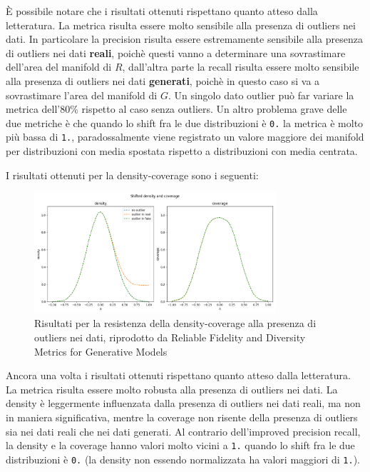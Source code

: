 È possibile notare che i risultati ottenuti rispettano quanto atteso dalla letteratura. La metrica risulta essere molto sensibile alla presenza di outliers nei dati.
In particolare la precision risulta essere estremamente sensibile alla presenza di outliers nei dati \textbf{reali}, poichè questi vanno a determinare una sovrastimare dell'area del manifold di \(R\), dall'altra parte 
la recall risulta essere molto sensibile alla presenza di outliers nei dati \textbf{generati}, poichè in questo caso si va a sovrastimare l'area del manifold di \(G\).
Un singolo dato outlier può far variare la metrica dell'80\% rispetto al caso senza outliers.
Un altro problema grave delle due metriche è che quando lo shift fra le due distribuzioni è \texttt{0.} la metrica è molto più bassa di \texttt{1.}, paradossalmente viene registrato un valore maggiore dei manifold per distribuzioni con media spostata rispetto a distribuzioni con media centrata.

I risultati ottenuti per la density-coverage sono i seguenti:

\begin{figure}[!ht]
    \centering
    \includegraphics[width=0.8\textwidth]{../images/toyexperiments/outliers/shift_density_coverage.png} 
    \caption{Risultati per la resistenza della density-coverage alla presenza di outliers nei dati, riprodotto da Reliable Fidelity and Diversity Metrics for Generative Models \cite{3ReliableFidelityDiversityMetrics}}
\end{figure}

Ancora una volta i risultati ottenuti rispettano quanto atteso dalla letteratura. La metrica risulta essere molto robusta alla presenza di outliers nei dati.
La density è leggermente influenzata dalla presenza di outliers nei dati reali, ma non in maniera significativa, mentre la coverage non risente della presenza di outliers sia nei dati reali che nei dati generati.
Al contrario dell'improved precision recall, la density e la coverage hanno valori molto vicini a \texttt{1.} quando lo shift fra le due distribuzioni è \texttt{0.} (la density non essendo normalizzata ha valori maggiori di \texttt{1.}).

